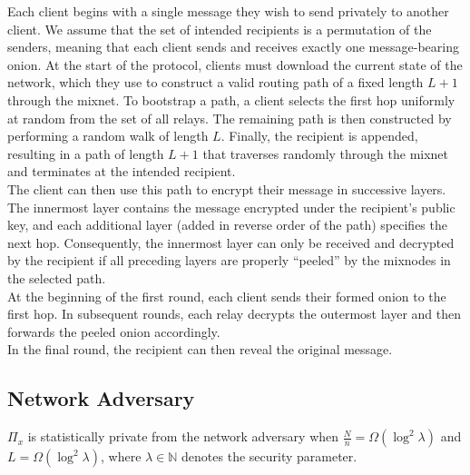 Each client begins with a single message they wish to send privately to another client. We assume that the set of intended recipients is a permutation of the senders, meaning that each client sends and receives exactly one message-bearing onion. At the start of the protocol, clients must download the current state of the network, which they use to construct a valid routing path of a fixed length $L + 1$ through the mixnet. To bootstrap a path, a client selects the first hop uniformly at random from the set of all relays. The remaining path is then constructed by performing a random walk of length $L$. Finally, the recipient is appended, resulting in a path of length $L + 1$ that traverses randomly through the mixnet and terminates at the intended recipient.\\

The client can then use this path to encrypt their message in successive layers. The innermost layer contains the message encrypted under the recipient’s public key, and each additional layer (added in reverse order of the path) specifies the next hop. Consequently, the innermost layer can only be received and decrypted by the recipient if all preceding layers are properly ``peeled'' by the mixnodes in the selected path.\\

At the beginning of the first round, each client sends their formed onion to the first hop. In subsequent rounds, each relay decrypts the outermost layer and then forwards the peeled onion accordingly.\\

In the final round, the recipient can then reveal the original message.

\subsection{Network Adversary}

\begin{theorem} \label{clm:network}
    $\Pi_x$ is statistically private from the network adversary when $\frac{N}{n} = \Omega(\log^2 \lambda)$ and $L = \Omega(\log^2 \lambda)$, where $\lambda \in \mathbb{N}$ denotes the security parameter.\\
\end{theorem}



